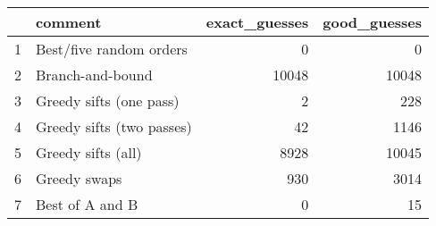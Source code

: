 \begin{table}[ht]
\centering
\begin{tabular}{rlrr}
  \hline
 & comment & exact\_guesses & good\_guesses \\ 
  \hline
1 & Best/five random orders &   0 &   0 \\ 
  2 & Branch-and-bound & 10048 & 10048 \\ 
  3 & Greedy sifts (one pass) &   2 & 228 \\ 
  4 & Greedy sifts (two passes) &  42 & 1146 \\ 
  5 & Greedy sifts (all) & 8928 & 10045 \\ 
  6 & Greedy swaps & 930 & 3014 \\ 
  7 & Best of A and B &   0 &  15 \\ 
   \hline
\end{tabular}
\end{table}
